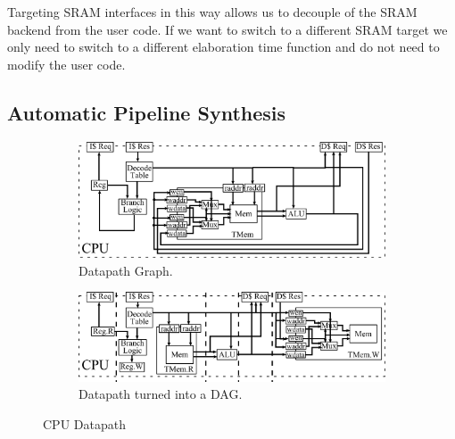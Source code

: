 Targeting SRAM interfaces in this way allows us to decouple of the
SRAM backend from the user code. If we want to switch to a different
SRAM target we only need to switch to a different elaboration time
function and do not need to modify the user code.

\subsection{Automatic Pipeline Synthesis}
\begin{figure}[htb]
\centering
  \begin{subfigure}[t]{0.8\textwidth}
  \centering
  \includegraphics[width=\textwidth]{figures/pipeline.pdf}
  \caption{Datapath Graph.}
  \label{fig:datapathgrah}
  \end{subfigure}
  \begin{subfigure}[t]{0.8\textwidth}
  \vspace{20pt}
  \centering
  \includegraphics[width=\textwidth]{figures/pipelinedag.pdf}
  \caption{Datapath turned into a DAG.}
  \label{fig:datapathdag}
  \end{subfigure}
\caption{CPU Datapath}
\label{fig:datapath}
\end{figure}

